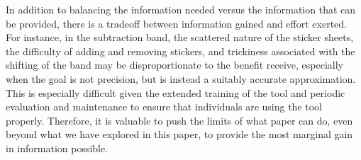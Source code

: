 \documentclass{sig-alternate}
\begin{document}
In addition to balancing the information needed versus the information that can be provided, there is a tradeoff between information gained and effort exerted. For instance, in the subtraction band, the scattered nature of the sticker sheets, the difficulty of adding and removing stickers, and trickiness associated with the shifting of the band may be disproportionate to the benefit receive, especially when the goal is not precision, but is instead a suitably accurate approximation. This is especially difficult given the extended training of the tool and periodic evaluation and maintenance to ensure that individuals are using the tool properly. Therefore, it is valuable to push the limits of what paper can do, even beyond what we have explored in this paper, to provide the most marginal gain in information possible.



\end{document}
